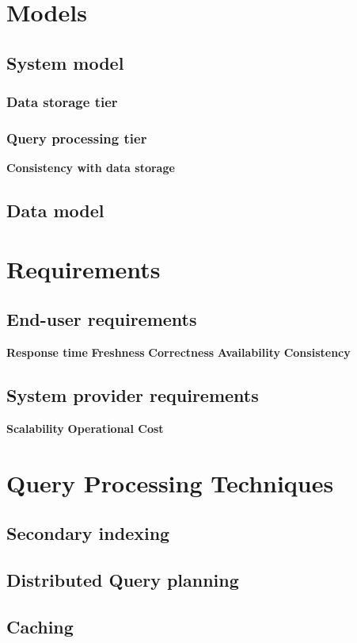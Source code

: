 \section{Models}
\subsection{System model}
\subsubsection{Data storage tier}
\subsubsection{Query processing tier}
\textbf{Consistency with data storage}

\subsection{Data model}


\section{Requirements}
\subsection{End-user requirements}
\textbf{Response time}
\textbf{Freshness}
\textbf{Correctness}
\textbf{Availability}
\textbf{Consistency}

\subsection{System provider requirements}
\textbf{Scalability}
\textbf{Operational Cost}

\section{Query Processing Techniques}
\subsection{Secondary indexing}
\subsection{Distributed Query planning}
\subsection{Caching}